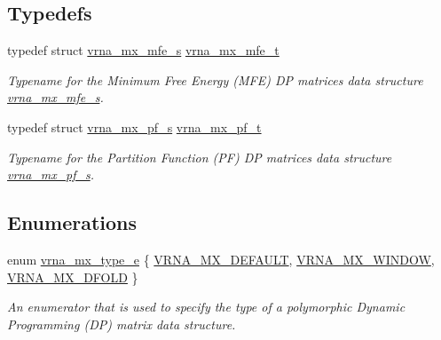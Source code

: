 \subsection*{Typedefs}
\begin{DoxyCompactItemize}
\item 
\mbox{\label{group__dp__matrices_gae5aef35d016475e758f619b7bcb534f9}} 
typedef struct \hyperlink{group__dp__matrices_structvrna__mx__mfe__s}{vrna\+\_\+mx\+\_\+mfe\+\_\+s} \hyperlink{group__dp__matrices_gae5aef35d016475e758f619b7bcb534f9}{vrna\+\_\+mx\+\_\+mfe\+\_\+t}
\begin{DoxyCompactList}\small\item\em Typename for the Minimum Free Energy (M\+FE) DP matrices data structure \hyperlink{group__dp__matrices_structvrna__mx__mfe__s}{vrna\+\_\+mx\+\_\+mfe\+\_\+s}. \end{DoxyCompactList}\item 
\mbox{\label{group__dp__matrices_ga68729ab3fed26bdd1806fa814f172fc1}} 
typedef struct \hyperlink{group__dp__matrices_structvrna__mx__pf__s}{vrna\+\_\+mx\+\_\+pf\+\_\+s} \hyperlink{group__dp__matrices_ga68729ab3fed26bdd1806fa814f172fc1}{vrna\+\_\+mx\+\_\+pf\+\_\+t}
\begin{DoxyCompactList}\small\item\em Typename for the Partition Function (PF) DP matrices data structure \hyperlink{group__dp__matrices_structvrna__mx__pf__s}{vrna\+\_\+mx\+\_\+pf\+\_\+s}. \end{DoxyCompactList}\end{DoxyCompactItemize}
\subsection*{Enumerations}
\begin{DoxyCompactItemize}
\item 
enum \hyperlink{group__dp__matrices_ga6042ea1d58d01931e959791be6d89343}{vrna\+\_\+mx\+\_\+type\+\_\+e} \{ \hyperlink{group__dp__matrices_gga6042ea1d58d01931e959791be6d89343aafa2568956dab79595521e20c49a5f75}{V\+R\+N\+A\+\_\+\+M\+X\+\_\+\+D\+E\+F\+A\+U\+LT}, 
\hyperlink{group__dp__matrices_gga6042ea1d58d01931e959791be6d89343a2ea5d5947f6ec02544934b0ff2785e99}{V\+R\+N\+A\+\_\+\+M\+X\+\_\+\+W\+I\+N\+D\+OW}, 
\hyperlink{group__dp__matrices_gga6042ea1d58d01931e959791be6d89343ae656f8391445ff71bed8a597a0a19417}{V\+R\+N\+A\+\_\+\+M\+X\+\_\+D\+F\+O\+LD}
 \}\begin{DoxyCompactList}\small\item\em An enumerator that is used to specify the type of a polymorphic Dynamic Programming (DP) matrix data structure. \end{DoxyCompactList}
\end{DoxyCompactItemize}
